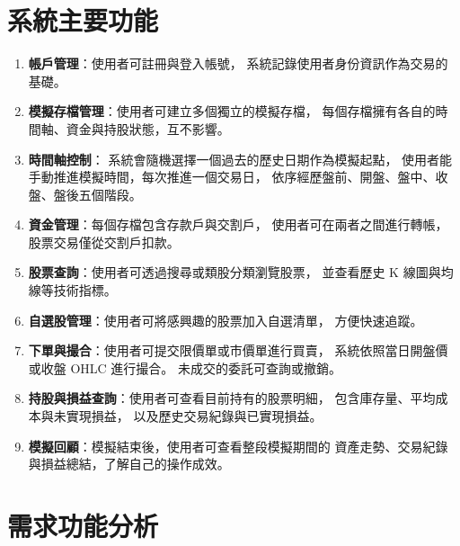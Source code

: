 \documentclass[UTF8, a4paper, 12pt, fontset=none]{ctexart}
\begin{document}
    \section{系統主要功能}
    \begin{enumerate}
        \item \textbf{帳戶管理}：使用者可註冊與登入帳號，
        系統記錄使用者身份資訊作為交易的基礎。

        \item \textbf{模擬存檔管理}：使用者可建立多個獨立的模擬存檔，
        每個存檔擁有各自的時間軸、資金與持股狀態，互不影響。

        \item \textbf{時間軸控制}：
        系統會隨機選擇一個過去的歷史日期作為模擬起點，
        使用者能手動推進模擬時間，每次推進一個交易日，
        依序經歷盤前、開盤、盤中、收盤、盤後五個階段。

        \item \textbf{資金管理}：每個存檔包含存款戶與交割戶，
        使用者可在兩者之間進行轉帳，股票交易僅從交割戶扣款。

        \item \textbf{股票查詢}：使用者可透過搜尋或類股分類瀏覽股票，
        並查看歷史 K 線圖與均線等技術指標。

        \item \textbf{自選股管理}：使用者可將感興趣的股票加入自選清單，
        方便快速追蹤。

        \item \textbf{下單與撮合}：使用者可提交限價單或市價單進行買賣，
        系統依照當日開盤價或收盤 OHLC 進行撮合。
        未成交的委託可查詢或撤銷。

        \item \textbf{持股與損益查詢}：使用者可查看目前持有的股票明細，
        包含庫存量、平均成本與未實現損益，
        以及歷史交易紀錄與已實現損益。

        \item \textbf{模擬回顧}：模擬結束後，使用者可查看整段模擬期間的
        資產走勢、交易紀錄與損益總結，了解自己的操作成效。
    \end{enumerate}
    
    \section{需求功能分析}
\end{document}
